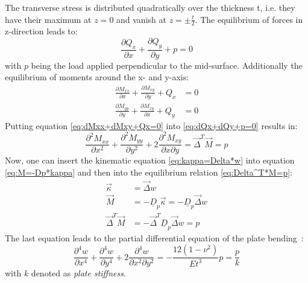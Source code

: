   The transverse stress is distributed quadratically over the thickness t, i.e. they have their maximum at $z=0$ and vanish at $z = \pm \frac{t}{2}$. The equilibrium of forces in z-direction leads to:
  \begin{equation}\label{eq:dQx+dQy+p=0}
  \frac{\partial Q_x}{\partial x} + \frac{\partial Q_y}{\partial y} + p = 0
  \end{equation}
  with $p$ being the load applied perpendicular to the mid-surface. Additionally the equilibrium of moments around the x- and y-axis:\\
  \begin{align}\label{eq:dMxx+dMxy+Qx=0}
  \frac{\partial M_{xx}}{\partial x} + \frac{\partial M_{xy}}{\partial y} + Q_x &= 0 \nonumber\\
  \frac{\partial M_{yy}}{\partial y} + \frac{\partial M_{xy}}{\partial x} + Q_y &= 0
  \end{align}
  Putting equation \eqref{eq:dMxx+dMxy+Qx=0} into \eqref{eq:dQx+dQy+p=0} results in:
  \begin{equation}\label{eq:Delta^T*M=p}
  \frac{\partial^2 M_{xx}}{\partial x^2} + \frac{\partial^2 M_{yy}}{\partial y^2} + 2\frac{\partial^2 M_{xy}}{\partial x\partial y} = \vec{\Delta}^T \vec{M} = p
  \end{equation}
  Now, one can insert the kinematic equation \eqref{eq:kappa=Delta*w} into equation \eqref{eq:M=-Dp*kappa} and then into the equilibrium relation \eqref{eq:Delta^T*M=p}:
  \begin{align}
  \vec{\kappa} &= \vec{\Delta}w \nonumber\\
  \vec{M} &= -\underline{D}_p \vec{\kappa} = -\underline{D}_p \vec{\Delta} w \nonumber\\
  \vec{\Delta}^T \vec{M} &= -\vec{\Delta}^T \underline{D}_p \vec{\Delta} w = p
  \end{align}
  The last equation leads to the partial differential equation of the plate bending~\cite{klein2013fem}:
  \begin{equation}
  \frac{\partial^4 w}{\partial x^4} + \frac{\partial^4 w}{\partial y^4} + 2\frac{\partial^4 w}{\partial x^2 \partial y^2} = -\frac{12(1-\nu^2)}{E t^3} p = \frac{p}{k}
  \end{equation}
  with $k$ denoted as \textit{plate stiffness}.
  

